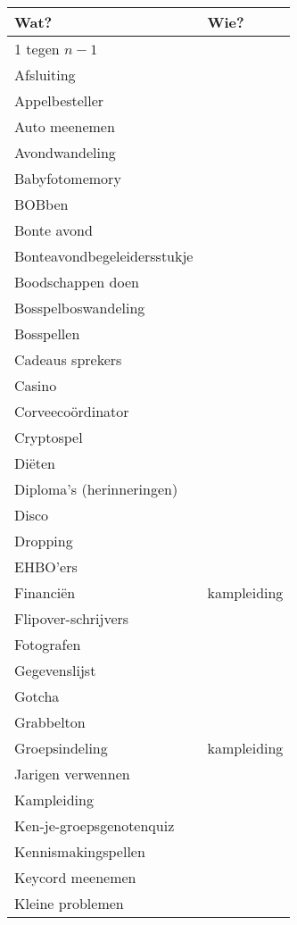 \documentclass{takenlijst}
\begin{document}

\enlargethispage{3cm}
\begin{center}
\begin{small}
\begin{tabular}{|l|l|}
\hline
Wat? & Wie?\\
\hline
\hline
1 tegen $n-1$ & \\
\hline
Afsluiting & \\
\hline
Appelbesteller & \\
\hline
Auto meenemen & \\
\hline
Avondwandeling & \\
\hline
Babyfotomemory & \\
\hline
BOBben & \\
\hline
Bonte avond & \\
\hline
Bonteavondbegeleidersstukje & \\
\hline
Boodschappen doen & \\
\hline
Bosspelboswandeling & \\
\hline
Bosspellen & \\
\hline
Cadeaus sprekers & \\
\hline
Casino & \\
\hline
Corveeco\"ordinator & \\
\hline
Cryptospel & \\
\hline
Di\"eten & \\
\hline
Diploma's (herinneringen) & \\
\hline
Disco & \\
\hline
Dropping & \\
\hline
EHBO'ers & \\
\hline
Financi\"en & kampleiding\\
\hline
Flipover-schrijvers & \\
\hline
Fotografen & \\
\hline
Gegevenslijst & \\
\hline
Gotcha & \\
\hline
Grabbelton & \\
\hline
Groepsindeling & kampleiding\\
\hline
Jarigen verwennen & \\
\hline
Kampleiding & \\
\hline
Ken-je-groepsgenotenquiz & \\
\hline
Kennismakingspellen & \\
\hline
Keycord meenemen & \\
\hline
Kleine problemen & \\

\end{tabular}
\end{small}
\end{center}
\end{document}
